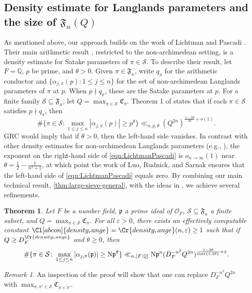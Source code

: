 \documentclass[11pt]{amsart}
\newtheorem{theorem}{Theorem}[section]
\theoremstyle{remark}
\newtheorem*{remark}{Remark}
\numberwithin{equation}{section}
\newcommand{\kp}{\mathfrak{p}}
\newcommand{\N}{\textnormal{N}}
\newcommand{\Q}{\mathbb{Q}}
\renewcommand{\tilde}{\widetilde}
\renewcommand{\epsilon}{\varepsilon}
\begin{document}
\subsection{Density estimate for Langlands parameters and the size of $\mathfrak{F}_n(Q)$}

As mentioned above, our approach builds on the work of Lichtman and Pascadi \cite{lichtman2024density}.  Their main arithmetic result \cite[Theorem 1]{lichtman2024density}, restricted to the non-archimedean setting, is a density estimate for Satake parameters of $\pi\in\mathcal{S}$.  To describe their result, let $F=\Q$, $p$ be prime, and $\theta>0$.  Given $\pi\in\mathfrak{F}_n$, write $q_{\pi}$ for the arithmetic conductor and $\{\alpha_{j,\pi}(p)\colon 1\leq j\leq n\}$ for the set of non-archimedean Langlands parameters of $\pi$ at $p$.  When $p\nmid q_{\pi}$, these are the Satake parameters at $p$.  For a finite family $\mathcal{S}\subseteq \mathfrak{F}_n$, let $Q=\max_{\pi\in\mathcal{S}}\mathfrak{C}_{\pi}$.  Theorem 1 of \cite{lichtman2024density} states that if each $\pi\in\mathcal{S}$ satisfies $p\nmid q_{\pi}$, then
\begin{equation}
\label{eqn:LichtmanPascadi}
\#\{\pi\in\mathcal{S}\colon \max_{1\leq j\leq n}|\alpha_{j,\pi}(p)|\geq p^{\theta}\}\ll_{n,p,\theta}(Q^{2n})^{\frac{1-2\theta}{4\theta}+o(1)}.
\end{equation}
GRC would imply that if $\theta>0$, then the left-hand side vanishes.  In contrast with other density estimates for non-archimedean Langlands parameters (e.g., \cite{blomer2023density,jana2020applications}), the exponent on the right-hand side of \eqref{eqn:LichtmanPascadi} is $o_{n \to \infty}(1)$ near $\theta = \frac{1}{2}-\frac{1}{n^2+1}$, at which point the work of Luo, Rudnick, and Sarnak \cite{LRS} ensures that the left-hand side of \eqref{eqn:LichtmanPascadi} equals zero. By combining our main technical result, \cref{thm:large-sieve-general}, with the ideas in \cite{lichtman2024density}, we achieve several refinements.
\begin{theorem}
\label{thm:density}
Let $F$ be a number field, $\kp$ a prime ideal of $\mathcal{O}_F$, $\mathcal{S}\subseteq \mathfrak{F}_n$ a finite subset, and $Q=\max_{\pi\in\mathcal{S}}\mathfrak{C}_{\pi}$.  For all $\epsilon>0$, there exists an effectively computable constant $\Cl[abcon]{density_range}=\Cr{density_range}(n,\epsilon)\geq 1$ such that if $Q\geq D_F^{\Cr{density_range}}$ and $\theta\geq 0$, then
\begin{equation}
\label{eqn:density}
\#\{\pi\in\mathcal{S}\colon \max_{1\leq j\leq n}|\alpha_{j,\pi}(\kp)|\geq\N\kp^{\theta}\}\ll_{n,[F:\Q]}\N\kp^{n}(D_F^{-n^2}Q^{2n})^{\frac{1-2\theta}{\max\{1,4\theta\}}+\epsilon}.
\end{equation}
\end{theorem}
\begin{remark}
An inspection of the proof will show that one can replace $D_F^{-n^2}Q^{2n}$ with $\max_{\pi,\pi'\in\mathcal{S}}\mathfrak{C}_{\pi\times\tilde{\pi}'}$.
\end{remark}
\end{document}
